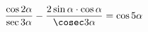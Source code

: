 \begin{ex}[type=prove_identity]
	\begin{condition}
		\( \dfrac{\cos2\alpha}{\sec3\alpha}-\dfrac{2\sin\alpha\cdot\cos\alpha}{\cosec3\alpha}=\cos5\alpha \)
	\end{condition}
\end{ex}